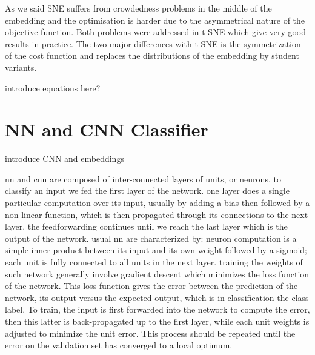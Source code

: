 \documentclass[a4paper,12pt]{report}
\begin{document}
As we said SNE suffers from crowdedness problems in the middle of the embedding and the optimisation is harder due to the asymmetrical nature of the objective function.
Both problems were addressed in t-SNE which give very good results in practice.
The two major differences with t-SNE is the symmetrization of the cost function and replaces the distributions of the embedding by student variants.

introduce equations here?

\section{NN and CNN Classifier}
introduce CNN and embeddings

nn and cnn are composed of inter-connected layers of units, or neurons.
to classify an input we fed the first layer of the network.
one layer does a single particular computation over its input, usually by adding a bias then followed by a non-linear function, which is then propagated through its connections to the next layer.
the feedforwarding continues until we reach the last layer which is the output of the network.
usual nn are characterized by: neuron computation is a simple inner product between its input and its own weight followed by a sigmoid; each unit is fully connected to all units in the next layer.
training the weights of such network generally involve gradient descent which minimizes the loss function of the network.
This loss function gives the error between the prediction of the network, its output versus the expected output, which is in classification the class label.
To train, the input is first forwarded into the network to compute the error, then this latter is back-propagated up to the first layer, while each unit weights is adjusted to minimize the unit error.
This process should be repeated until the error on the validation set has converged to a local optimum.
\end{document}

